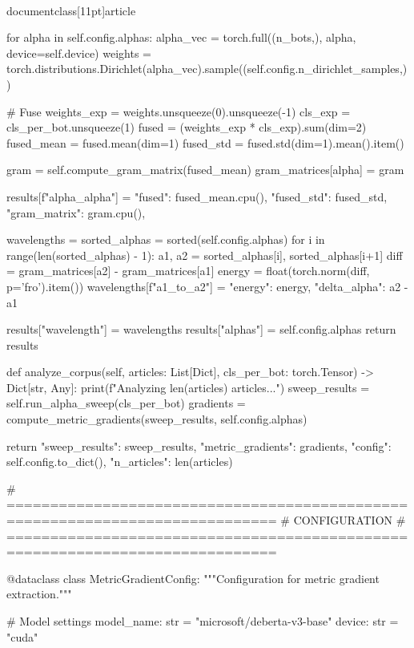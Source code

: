 \\documentclass[11pt]{article}
\begin{document}
\begin{CodeBlock}
        for alpha in self.config.alphas:
            alpha_vec = torch.full((n_bots,), alpha, device=self.device)
            weights = torch.distributions.Dirichlet(alpha_vec).sample((self.config.n_dirichlet_samples,))
            
            # Fuse
            weights_exp = weights.unsqueeze(0).unsqueeze(-1)
            cls_exp = cls_per_bot.unsqueeze(1)
            fused = (weights_exp * cls_exp).sum(dim=2)
            fused_mean = fused.mean(dim=1)
            fused_std = fused.std(dim=1).mean().item()
            
            gram = self.compute_gram_matrix(fused_mean)
            gram_matrices[alpha] = gram
            
            results[f"alpha_{alpha}"] = {
                "fused": fused_mean.cpu(),
                "fused_std": fused_std,
                "gram_matrix": gram.cpu(),
            }
            
        wavelengths = {}
        sorted_alphas = sorted(self.config.alphas)
        for i in range(len(sorted_alphas) - 1):
            a1, a2 = sorted_alphas[i], sorted_alphas[i+1]
            diff = gram_matrices[a2] - gram_matrices[a1]
            energy = float(torch.norm(diff, p='fro').item())
            wavelengths[f"{a1}_to_{a2}"] = {"energy": energy, "delta_alpha": a2 - a1}
            
        results["wavelength"] = wavelengths
        results["alphas"] = self.config.alphas
        return results

    def analyze_corpus(self, articles: List[Dict], cls_per_bot: torch.Tensor) -> Dict[str, Any]:
        print(f"\n[AlphaStability] Analyzing {len(articles)} articles...")
        sweep_results = self.run_alpha_sweep(cls_per_bot)
        gradients = compute_metric_gradients(sweep_results, self.config.alphas)
        
        return {
            "sweep_results": sweep_results,
            "metric_gradients": gradients,
            "config": self.config.to_dict(),
            "n_articles": len(articles)
        }


# =============================================================================
# CONFIGURATION
# =============================================================================

@dataclass
class MetricGradientConfig:
    """Configuration for metric gradient extraction."""
    
    # Model settings
    model_name: str = "microsoft/deberta-v3-base"
    device: str = "cuda"
    

\end{CodeBlock}
\end{document}

